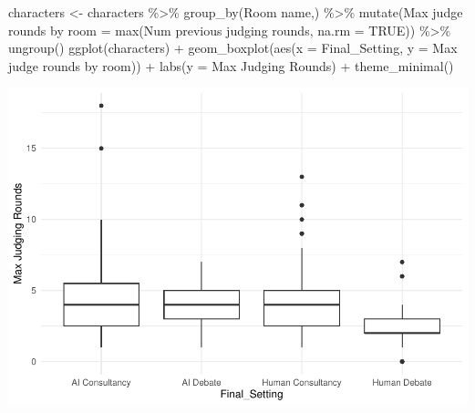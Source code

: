 \documentclass[
]{article}
\newenvironment{Shaded}{\begin{snugshade}}{\end{snugshade}}
\newcommand{\AttributeTok}[1]{\textcolor[rgb]{0.77,0.63,0.00}{#1}}
\newcommand{\ConstantTok}[1]{\textcolor[rgb]{0.00,0.00,0.00}{#1}}
\newcommand{\FunctionTok}[1]{\textcolor[rgb]{0.00,0.00,0.00}{#1}}
\newcommand{\NormalTok}[1]{#1}
\newcommand{\OtherTok}[1]{\textcolor[rgb]{0.56,0.35,0.01}{#1}}
\newcommand{\SpecialCharTok}[1]{\textcolor[rgb]{0.00,0.00,0.00}{#1}}
\newcommand{\StringTok}[1]{\textcolor[rgb]{0.31,0.60,0.02}{#1}}
\begin{document}
\begin{Shaded}
\begin{Highlighting}[]
\NormalTok{characters }\OtherTok{\textless{}{-}}\NormalTok{ characters }\SpecialCharTok{\%\textgreater{}\%}
  \FunctionTok{group\_by}\NormalTok{(}\StringTok{\textasciigrave{}}\AttributeTok{Room name}\StringTok{\textasciigrave{}}\NormalTok{,) }\SpecialCharTok{\%\textgreater{}\%}
  \FunctionTok{mutate}\NormalTok{(}\StringTok{\textasciigrave{}}\AttributeTok{Max judge rounds by room}\StringTok{\textasciigrave{}} \OtherTok{=} \FunctionTok{max}\NormalTok{(}\StringTok{\textasciigrave{}}\AttributeTok{Num previous judging rounds}\StringTok{\textasciigrave{}}\NormalTok{, }\AttributeTok{na.rm =} \ConstantTok{TRUE}\NormalTok{)) }\SpecialCharTok{\%\textgreater{}\%}
  \FunctionTok{ungroup}\NormalTok{()}
\FunctionTok{ggplot}\NormalTok{(characters) }\SpecialCharTok{+}
  \FunctionTok{geom\_boxplot}\NormalTok{(}\FunctionTok{aes}\NormalTok{(}\AttributeTok{x =}\NormalTok{ Final\_Setting, }\AttributeTok{y =} \StringTok{\textasciigrave{}}\AttributeTok{Max judge rounds by room}\StringTok{\textasciigrave{}}\NormalTok{)) }\SpecialCharTok{+}
  \FunctionTok{labs}\NormalTok{(}\AttributeTok{y =} \StringTok{\textquotesingle{}Max Judging Rounds\textquotesingle{}}\NormalTok{) }\SpecialCharTok{+}
  \FunctionTok{theme\_minimal}\NormalTok{() }
\end{Highlighting}
\end{Shaded}

\includegraphics[width=1\linewidth]{debate-2309_files/figure-latex/rounds graph-1}

\begin{Shaded}
\end{Shaded}
\end{document}

